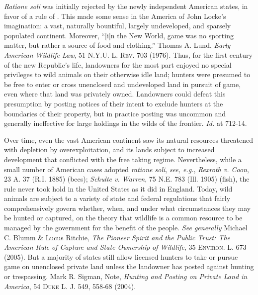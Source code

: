 \textit{Ratione soli} was initially rejected by the newly independent American
states, in favor of a rule of . This made some sense in the
America of John Locke's imagination: a vast, naturally bountiful, largely
undeveloped, and sparsely populated continent. Moreover, ``[i]n the New World,
game was no sporting matter, but rather a source of food and clothing.'' Thomas
A. Lund, \textit{Early American Wildlife Law}, 51 \textsc{N.Y.U. L. Rev.} 703
(1976). Thus, for the first century of the new Republic's life, landowners for
the most part enjoyed no special privileges to wild animals on their otherwise
idle land; hunters were presumed to be free to enter or cross unenclosed and
undeveloped land in pursuit of game, even where that land was privately owned.
Landowners could defeat this presumption by posting notices of their intent to
exclude hunters at the boundaries of their property, but in practice posting was
uncommon and generally ineffective for large holdings in the wilds of the
frontier. \textit{Id.} at 712-14.

Over time, even the vast American continent saw its natural resources threatened
with depletion by overexploitation, and its lands subject to increased
development that conflicted with the free taking regime. Nevertheless, while a
small number of American cases adopted \textit{ratione soli}, \textit{see,
e.g.}, \emph{Rexroth v. Coon}, 23 A. 37 (R.I. 1885) (bees); \emph{Schulte v.
Warren}, 75 N.E. 783 (Ill. 1905) (fish), the rule never took hold in the United
States as it
did in England. Today, wild animals are subject to a variety of state and
federal regulations that fairly comprehensively govern whether, when, and under
what circumstances they may be hunted or captured, on the theory that wildlife
is a common resource to be managed by the government for the benefit of the
people. \textit{See generally} Michael C. Blumm \& Lucus Ritchie, \textit{The
Pioneer Spirit and the Public Trust: The American Rule of Capture and State
Ownership of Wildlife}, 35 \textsc{Environ. L.} 673 (2005). But a majority of
states still allow licensed hunters to take or pursue game on unenclosed private
land unless the landowner has posted against hunting or trespassing. Mark R.
Sigman, Note, \emph{Hunting and Posting on Private Land in America}, 54
\textsc{Duke
L. J.} 549, 558-68 (2004).


